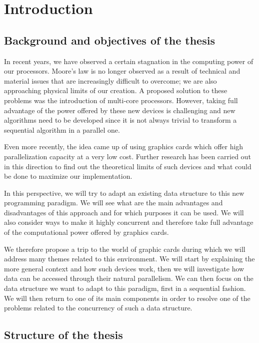 \chapter{Introduction}
\setcounter{page}{1}

\section{Background and objectives of the thesis}

In recent years, we have observed a certain stagnation in the computing power of our processors. Moore's law is no longer observed as a result of technical and material issues that are increasingly difficult to overcome; we are also approaching physical limits of our creation. A proposed solution to these problems was the introduction of multi-core processors. However, taking full advantage of the power offered by these new devices is challenging and new algorithms need to be developed since it is not always trivial to transform a sequential algorithm in a parallel one.

Even more recently, the idea came up of using graphics cards which offer high parallelization capacity at a very low cost. Further research has been carried out in this direction to find out the theoretical limits of such devices and what could be done to maximize our implementation.

In this perspective, we will try to adapt an existing data structure to this new programming paradigm. We will see what are the main advantages and disadvantages of this approach and for which purposes it can be used. We will also consider ways to make it highly concurrent and therefore take full advantage of the computational power offered by graphics cards.

We therefore propose a trip to the world of graphic cards during which we will address many themes related to this environment. We will start by explaining the more general context and how such devices work, then we will investigate how data can be accessed through their natural parallelism. We can then focus on the data structure we want to adapt to this paradigm, first in a sequential fashion. We will then return to one of its main components in order to resolve one of the problems related to the concurrency of such a data structure.

\section{Structure of the thesis}

